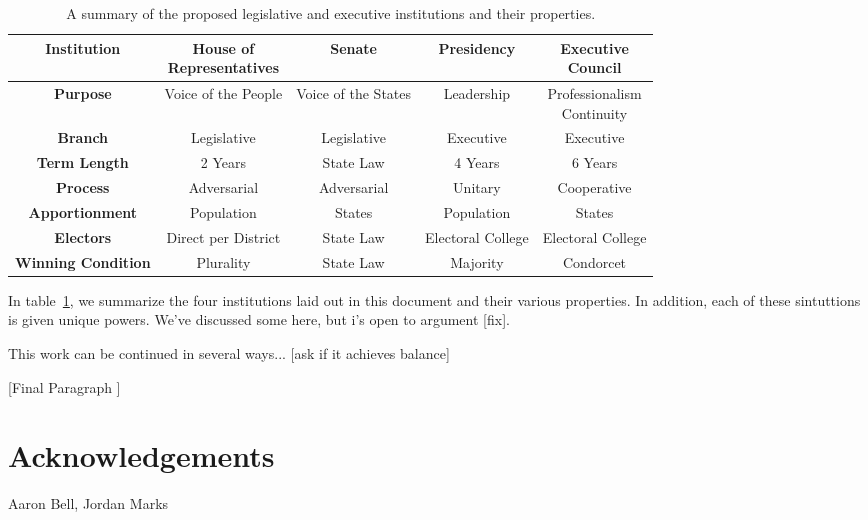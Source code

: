 \documentclass{article}
\begin{document}
\begin{table}[ht]
\label{table:institutions}
\centering
\renewcommand{\arraystretch}{1.5}
\begin{tabular}{|c|c|c|c|c|}
\hline
\textbf{Institution} & \makecell{House of \\ Representatives} & Senate & Presidency & \makecell{Executive \\ Council}  \\
\hline
\textbf{Purpose} & Voice of the People & Voice of the States & Leadership & \makecell{Professionalism \\ Continuity} \\
\hline
\textbf{Branch} & Legislative & Legislative & Executive & Executive \\
\hline
\textbf{Term Length} & 2 Years & State Law & 4 Years & 6 Years \\
\hline
\textbf{Process} & Adversarial & Adversarial & Unitary & Cooperative \\
\hline
\textbf{Apportionment} & Population & States & Population & States  \\
\hline
\textbf{Electors} & Direct per District & State Law  & Electoral College & Electoral College  \\
\hline
\textbf{Winning Condition} & Plurality & State Law & Majority & Condorcet  \\
\hline
\end{tabular}
\caption{A summary of the proposed legislative and executive institutions and their properties. }
\end{table}

In table~\ref{table:institutions}, we summarize the four institutions laid out in this document and their various properties. In addition, each of these sintuttions is given unique powers. We've discussed some here, but i's open to argument [fix].

This work can be continued in several ways... [ask if it achieves balance]

[Final Paragraph ]

\section{Acknowledgements}

Aaron Bell, Jordan Marks
\end{document}
